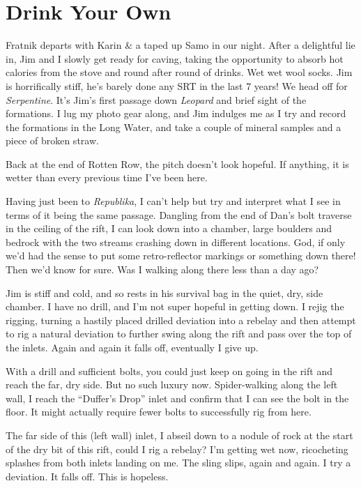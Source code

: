 
\hypertarget{drink-your-own}{%
\section{Drink Your Own}\label{drink-your-own}}

Fratnik departs with Karin \& a taped up Samo in our night. After a
delightful lie in, Jim and I slowly get ready for caving, taking the
opportunity to absorb hot calories from the stove and round after round
of drinks. Wet wet wool socks. Jim is horrifically stiff, he's barely
done any SRT in the last 7 years! We head off for \emph{Serpentine}.
It's Jim's first passage down \emph{Leopard} and brief sight of the
formations. I lug my photo gear along, and Jim indulges me as I try and
record the formations in the Long Water, and take a couple of mineral
samples and a piece of broken straw.

Back at the end of Rotten Row, the pitch doesn't look hopeful. If
anything, it is wetter than every previous time I've been here.

Having just been to \emph{Republika}, I can't help but try and interpret
what I see in terms of it being the same passage. Dangling from the end
of Dan's bolt traverse in the ceiling of the rift, I can look down into
a chamber, large boulders and bedrock with the two streams crashing down
in different locations. God, if only we'd had the sense to put some
retro-reflector markings or something down there! Then we'd know for
sure. Was I walking along there less than a day ago?

Jim is stiff and cold, and so rests in his survival bag in the quiet,
dry, side chamber. I have no drill, and I'm not super hopeful in getting
down. I rejig the rigging, turning a hastily placed drilled deviation
into a rebelay and then attempt to rig a natural deviation to further
swing along the rift and pass over the top of the inlets. Again and
again it falls off, eventually I give up.

With a drill and sufficient bolts, you could just keep on going in the
rift and reach the far, dry side. But no such luxury now. Spider-walking
along the left wall, I reach the ``Duffer's Drop'' inlet and confirm
that I can see the bolt in the floor. It might actually require fewer
bolts to successfully rig from here.

The far side of this (left wall) inlet, I abseil down to a nodule of
rock at the start of the dry bit of this rift, could I rig a rebelay?
I'm getting wet now, ricocheting splashes from both inlets landing on
me. The sling slips, again and again. I try a deviation. It falls off.
This is hopeless.

